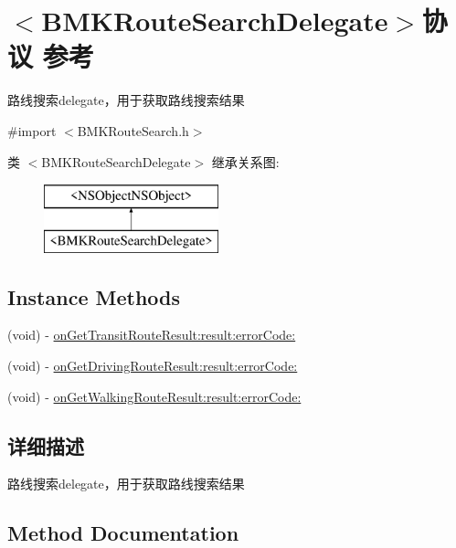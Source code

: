 \hypertarget{protocol_b_m_k_route_search_delegate-p}{}\section{$<$B\+M\+K\+Route\+Search\+Delegate$>$协议 参考}
\label{protocol_b_m_k_route_search_delegate-p}


路线搜索delegate，用于获取路线搜索结果  




{\ttfamily \#import $<$B\+M\+K\+Route\+Search.\+h$>$}

类 $<$B\+M\+K\+Route\+Search\+Delegate$>$ 继承关系图\+:\begin{figure}[H]
\begin{center}
\leavevmode
\includegraphics[height=2.000000cm]{protocol_b_m_k_route_search_delegate-p}
\end{center}
\end{figure}
\subsection*{Instance Methods}
\begin{DoxyCompactItemize}
\item 
(void) -\/ \hyperlink{protocol_b_m_k_route_search_delegate-p_adc734b9f771f0a2f600e0dc9da42fc9b}{on\+Get\+Transit\+Route\+Result\+:result\+:error\+Code\+:}
\item 
(void) -\/ \hyperlink{protocol_b_m_k_route_search_delegate-p_ad59fd0b2fd5232e5c8f36a30cc8f842f}{on\+Get\+Driving\+Route\+Result\+:result\+:error\+Code\+:}
\item 
(void) -\/ \hyperlink{protocol_b_m_k_route_search_delegate-p_aad8e804e5ef257146f31e7665a2edafa}{on\+Get\+Walking\+Route\+Result\+:result\+:error\+Code\+:}
\end{DoxyCompactItemize}


\subsection{详细描述}
路线搜索delegate，用于获取路线搜索结果 

\subsection{Method Documentation}
\hypertarget{protocol_b_m_k_route_search_delegate-p_ad59fd0b2fd5232e5c8f36a30cc8f842f}{}
